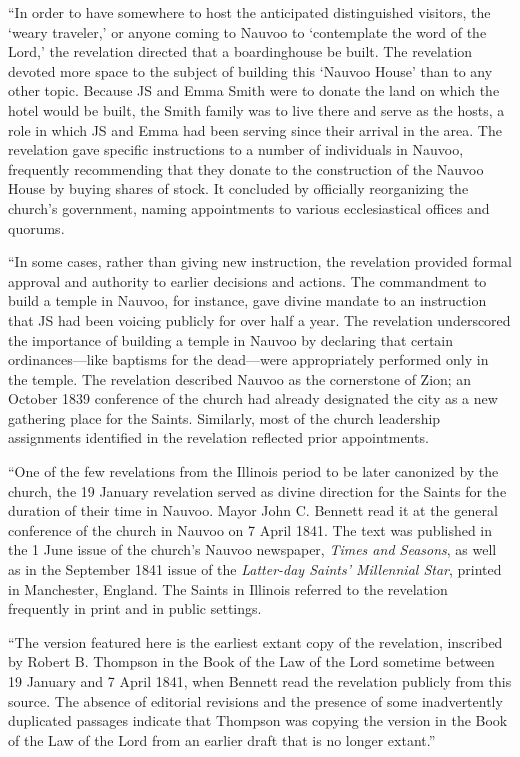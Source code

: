 			``In order to have somewhere to host the anticipated distinguished visitors, the `weary traveler,' or anyone coming to Nauvoo to `contemplate the word of the Lord,' the revelation directed that a boardinghouse be built. The revelation devoted more space to the subject of building this `Nauvoo House' than to any other topic. Because JS and Emma Smith were to donate the land on which the hotel would be built, the Smith family was to live there and serve as the hosts, a role in which JS and Emma had been serving since their arrival in the area. The revelation gave specific instructions to a number of individuals in Nauvoo, frequently recommending that they donate to the construction of the Nauvoo House by buying shares of stock. It concluded by officially reorganizing the church's government, naming appointments to various ecclesiastical offices and quorums.

			``In some cases, rather than giving new instruction, the revelation provided formal approval and authority to earlier decisions and actions. The commandment to build a temple in Nauvoo, for instance, gave divine mandate to an instruction that JS had been voicing publicly for over half a year. The revelation underscored the importance of building a temple in Nauvoo by declaring that certain ordinances---like baptisms for the dead---were appropriately performed only in the temple. The revelation described Nauvoo as the cornerstone of Zion; an October 1839 conference of the church had already designated the city as a new gathering place for the Saints. Similarly, most of the church leadership assignments identified in the revelation reflected prior appointments.

			``One of the few revelations from the Illinois period to be later canonized by the church, the 19 January revelation served as divine direction for the Saints for the duration of their time in Nauvoo. Mayor John C. Bennett read it at the general conference of the church in Nauvoo on 7 April 1841. The text was published in the 1 June issue of the church's Nauvoo newspaper, \textit{Times and Seasons}, as well as in the September 1841 issue of the \textit{Latter-day Saints' Millennial Star}, printed in Manchester, England. The Saints in Illinois referred to the revelation frequently in print and in public settings.

			``The version featured here is the earliest extant copy of the revelation, inscribed by Robert B. Thompson in the Book of the Law of the Lord sometime between 19 January and 7 April 1841, when Bennett read the revelation publicly from this source. The absence of editorial revisions and the presence of some inadvertently duplicated passages indicate that Thompson was copying the version in the Book of the Law of the Lord from an earlier draft that is no longer extant.''
					
